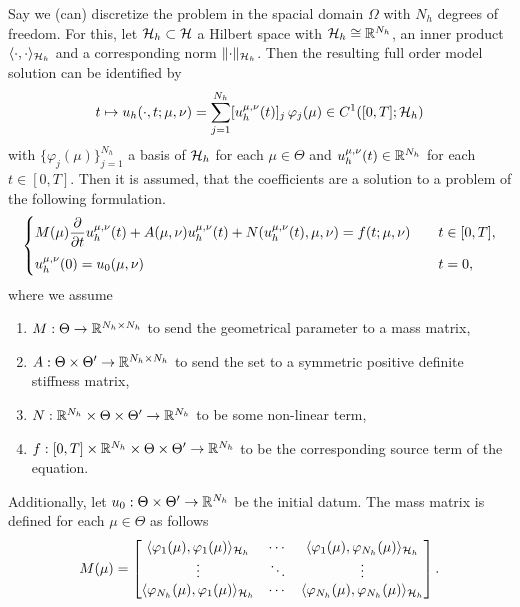 Say we (can) discretize the problem in the spacial domain $\Omega$ with $N_h$ degrees of freedom. For this, 
let $\mathcal{H}_h \subset \mathcal{H}$ a Hilbert space with $\mathcal{H}_h \cong \mathbb{R}^{N_h}$, an inner product 
$\langle \cdot, \cdot \rangle_{\mathcal{H}_h}$ and a corresponding norm $\lVert \cdot \rVert_{\mathcal{H}_h}$.
Then the resulting full order model solution can be identified by
\begin{equation} \label{eq: fom solution identity}
    t \mapsto u_h(\cdot, t; \mu, \nu) = \sum_{j = 1}^{N_h} [u_h^{\mu, \nu}(t)]_j \, \varphi_j(\mu) \in C^1([0, T]; \mathcal{H}_h) 
\end{equation}
with $\{\varphi_j(\mu)\}_{j=1}^{N_h}$ a basis of $\mathcal{H}_h$ for each $\mu \in \Theta$ and $u_h^{\mu, \nu}(t) \in \mathbb{R}^{N_h}$ 
for each $t \in [0, T]$. Then it is assumed, that the coefficients are a solution to a problem of the following
formulation.
\begin{equation} \label{eq: fom ppde}
    \begin{cases}
    \displaystyle
    M(\mu) \frac{\partial}{\partial{t}} u_h^{\mu, \nu}(t) + A(\mu, \nu) u_h^{\mu, \nu}(t) + 
    N(u_h^{\mu, \nu}(t), \mu, \nu)= f(t; \mu, \nu)  \quad &t \in [0, T], \\[0.8em]
    \displaystyle
    u_h^{\mu, \nu}(0) = u_0(\mu, \nu) \quad &t=0, \end{cases} 
\end{equation}
where we assume 
\begin{enumerate}
    \item[$\bullet$] $M: \Theta \to \mathbb{R}^{N_h \times N_h}$ to send the geometrical parameter to a mass matrix,
    \item[$\bullet$] $A: \Theta \times \Theta' \to \mathbb{R}^{N_h \times N_h}$ to send the set to a symmetric positive definite stiffness matrix,
    \item[$\bullet$] $N: \mathbb{R}^{N_h} \times \Theta \times \Theta' \to \mathbb{R}^{N_h}$ to be some non-linear term,
    \item[$\bullet$] $f: [0, T] \times \mathbb{R}^{N_h} \times \Theta \times \Theta' \to \mathbb{R}^{N_h}$ 
    to be the corresponding source term of the equation.
\end{enumerate}    
Additionally, let $u_0: \Theta \times \Theta' \to \mathbb{R}^{N_h}$ be the initial datum. 
The mass matrix is defined for each $\mu \in \Theta$ as follows
\begin{equation*}
    M(\mu) = \begin{bmatrix}
        \langle \varphi_1(\mu), \varphi_1(\mu) \rangle_{\mathcal{H}_h} & \cdots & \langle \varphi_1(\mu), \varphi_{N_h}(\mu) \rangle_{\mathcal{H}_h} \\
        \vdots & \ddots & \vdots \\
        \langle \varphi_{N_h}(\mu), \varphi_1(\mu) \rangle_{\mathcal{H}_h} & \cdots & \langle \varphi_{N_h}(\mu), \varphi_{N_h}(\mu) \rangle_{\mathcal{H}_h}
        \end{bmatrix}.
\end{equation*}
